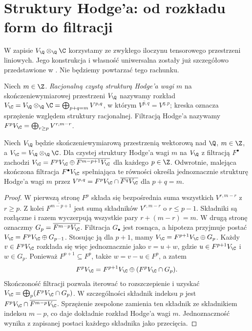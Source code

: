 \section{Struktury Hodge'a: od rozkładu form do filtracji}
W zapisie $V_\Q\otimes_\Q\C$ korzystamy ze zwykłego
iloczynu tensorowego przestrzeni liniowych.
Jego konstrukcja i własność uniwersalna zostały już
szczegółowo przedstawione w
.
Nie będziemy powtarzać tego rachunku.
\begin{definicja}
Niech $m\in\Z$. \emph{Racjonalną czystą strukturą
Hodge'a wagi $m$} na skończeniewymiarowej przestrzeni
$V_{\Q}$ nazywamy rozkład
$V_{\C}=V_{\Q}\otimes_{\Q}\C=\bigoplus_{p+q=m}V^{p,q}$,
w którym $\overline{V^{p,q}}=V^{q,p}$; kreska oznacza
sprzężenie względem struktury racjonalnej.
Filtracją Hodge'a nazywamy
$F^pV_{\C}=\bigoplus_{r\ge p}V^{r,m-r}$.
\end{definicja}
\begin{stwierdzenie}
\label{prop:hodge-filtration-xiv}
Niech $V_{\Q}$ będzie skończeniewymiarową
przestrzenią wektorową nad $\Q$, $m\in\Z$,
a $V_{\C}=V_{\Q}\otimes_{\Q}\C$.
Dla czystej struktury Hodge'a wagi $m$ na $V_{\Q}$
z filtracją $F^\bullet$ zachodzi
$V_{\C}=F^pV_{\C}\oplus\overline{F^{m-p+1}V_{\C}}$
dla każdego $p\in\Z$. Odwrotnie, malejąca skończona
filtracja $F^\bullet V_{\C}$ spełniająca te równości
określa jednoznacznie strukturę Hodge'a wagi $m$ przez
$V^{p,q}=F^pV_{\C}\cap\overline{F^qV_{\C}}$
dla $p+q=m$.
\end{stwierdzenie}
\begin{proof}
W pierwszą stronę $F^p$ składa się bezpośrednia suma
wszystkich $V^{r,m-r}$ z $r\ge p$. Z kolei
$\overline{F^{m-p+1}}$ jest sumą składników
$V^{r,m-r}$ o $r\le p-1$. Składniki są rozłączne
i razem wyczerpują wszystkie pary $r+(m-r)=m$.
W drugą stronę oznaczmy
$G_p=\overline{F^{m-p}V_{\C}}$.
Filtracja $G_\bullet$ jest rosnąca, a hipoteza
przyjmuje postać $V_{\C}=F^pV_{\C}\oplus G_{p-1}$.
Stosując ją dla $p+1$, mamy
$V_{\C}=F^{p+1}V_{\C}\oplus G_p$.
Każdy $v\in F^pV_{\C}$ rozkłada się więc
jednoznacznie jako $v=u+w$,
gdzie $u\in F^{p+1}V_{\C}$ i $w\in G_p$.
Ponieważ $F^{p+1}\subseteq F^p$, także
$w=v-u\in F^p$, a zatem
\[
F^pV_{\C}=F^{p+1}V_{\C}
\oplus(F^pV_{\C}\cap G_p).
\]
Skończoność filtracji pozwala iterować to
rozszczepienie i uzyskać
$V_{\C}=\bigoplus_p(F^pV_{\C}\cap G_p)$.
W szczególności składnik indeksu $p$ jest
$F^pV_{\C}\cap\overline{F^{m-p}V_{\C}}$.
Sprzężenie zespolone zamienia ten składnik
ze składnikiem indeksu $m-p$, co daje
dokładnie rozkład Hodge'a wagi $m$.
Jednoznaczność wynika z zapisanej postaci
każdego składnika jako przecięcia.
\end{proof}

